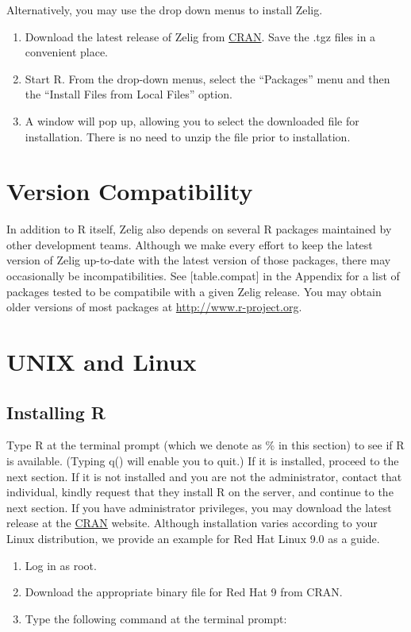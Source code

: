 \documentclass[letterpaper,10pt,english]{sphinxmanual}
\begin{document}
Alternatively, you may use the drop down menus to install Zelig.
\begin{enumerate}
\item {} 
Download the latest release of Zelig from \href{http://cran.us.r-project.org/bin/windows/base/}{CRAN}. Save the .tgz files in a convenient place.

\item {} 
Start R. From the drop-down menus, select the “Packages” menu and then the “Install Files from Local Files” option.

\item {} 
A window will pop up, allowing you to select the downloaded file for installation. There is no need to unzip the file prior to installation.

\end{enumerate}


\section{Version Compatibility}
\label{2_install:version-compatibility}
In addition to R itself, Zelig also depends on several R packages maintained by other development teams. Although we make every effort to keep the latest version of Zelig up-to-date with the latest version of those packages, there may occasionally be incompatibilities. See {[}table.compat{]} in the Appendix for a list of packages tested to be compatibile with a given Zelig release. You may obtain older versions of most packages at \href{http://www.r-project.org}{http://www.r-project.org}.


\section{UNIX and Linux}
\label{2_install:unix-and-linux}

\subsection{Installing R}
\label{2_install:id3}
Type R at the terminal prompt (which we denote as \% in this section) to see if R is available. (Typing q() will enable you to quit.) If it is installed, proceed to the next section. If it is not installed and you are not the administrator, contact that individual, kindly request that they install R on the server, and continue to the next section. If you have administrator privileges, you may download the latest release at the \href{http://cran.r-project.org/}{CRAN} website. Although installation varies according to your Linux distribution, we provide an example for Red Hat Linux 9.0 as a guide.
\begin{enumerate}
\item {} 
Log in as root.

\item {} 
Download the appropriate binary file for Red Hat 9 from CRAN.

\item {} 
Type the following command at the terminal prompt:

\end{enumerate}
\end{document}
